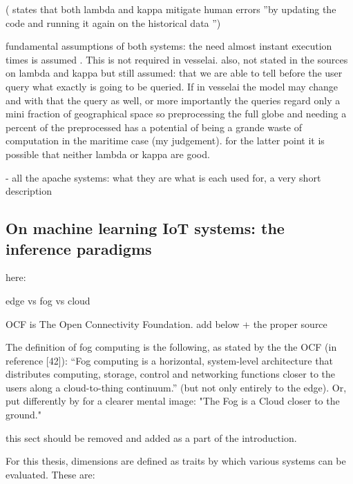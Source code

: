 (\cite{D1.1} states that both lambda and kappa mitigate human errors ''by  updating  the  code  and  running  it  again  on  the historical  data '')


fundamental assumptions of both systems:  the need almost instant execution times is assumed \cite{lambdakappa}. This is not required in vesselai. also, not stated in the sources on lambda and kappa but still assumed: that we are able to tell before the user query what exactly is going to be queried. If in vesselai the model may change and with that the query as well, or more importantly the queries regard only a mini fraction of geographical space so preprocessing the full globe and needing a percent of the preprocessed has a potential of being a grande waste of computation in the maritime case (my judgement). for the latter point it is possible that neither lambda or kappa are good.

- all the apache systems: what they are what is each used for, a very short description

\subsection{On machine learning IoT systems: the inference paradigms}

here:

edge vs fog vs cloud

OCF is The Open Connectivity Foundation. add below + the proper source

The definition of fog computing is the following, as stated by the the OCF (in \cite{fogsurvey} reference [42]): “Fog computing is a horizontal, system-level architecture that distributes computing, storage, control and networking functions closer to the users along a cloud-to-thing continuum.” (but not only entirely to the edge). Or, put differently by \cite{fogsurvey} for a clearer mental image: "The Fog is a Cloud closer to the ground."



this sect should be removed and added as a part of the introduction.

For this thesis, dimensions are defined as traits by which various systems can be evaluated. These are:

